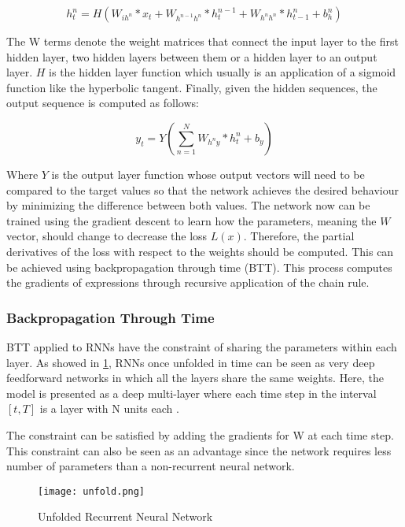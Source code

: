 \begin{equation} \label{eq:hidden}
h_t^n= H(W_{ih^n} * x_t + W_{h^{n-1}  h^n} * h^{n-1}_t +W_{h^n h^n} * h^n_{t-1}+ b^n_h)
\end{equation}

The W terms denote the weight matrices that connect the input layer to the first hidden layer, two hidden layers between them or a hidden layer to an output layer. $H$ is the hidden layer function which usually is an application of a sigmoid function like the hyperbolic tangent. Finally, given the hidden sequences, the output sequence is computed as follows:

\begin{equation} \label{eq:output}
y_t=Y(\sum_{n=1}^{N} W_{h^{n}y} * h^n_t + b_y)
\end{equation}

Where $Y$ is the output layer function whose output vectors will need to be compared to the target values so that the network achieves the desired behaviour by minimizing the difference between both values.
The network now can be trained using the gradient descent to learn how the parameters, meaning the $W$ vector, should change to decrease the loss  $L(x)$. Therefore, the partial derivatives of the loss with respect to the weights should be computed. This can be achieved using backpropagation through time (BTT). This process computes the gradients of expressions through recursive application of the chain rule.

\subsubsection{Backpropagation Through Time}
BTT applied to RNNs have the constraint of sharing the parameters within each layer. As showed in  \ref{fig:unfold}, RNNs once unfolded in time can be seen as very deep feedforward networks in which all the layers share the same weights\cite{lecun2015deep}. Here, the model is presented as a deep multi-layer where each time step in the interval $[t,T]$ is a layer with N units each \cite{pascanu2013difficulty}. 

The constraint can be satisfied by adding the gradients for W at each time step. This constraint can also be seen as an advantage since the network requires less number of parameters than a non-recurrent neural network.

\begin{figure}
\label{fig:unfold}
\center
\texttt{[image: unfold.png]}
\caption{Unfolded Recurrent Neural Network}
\end{figure}

